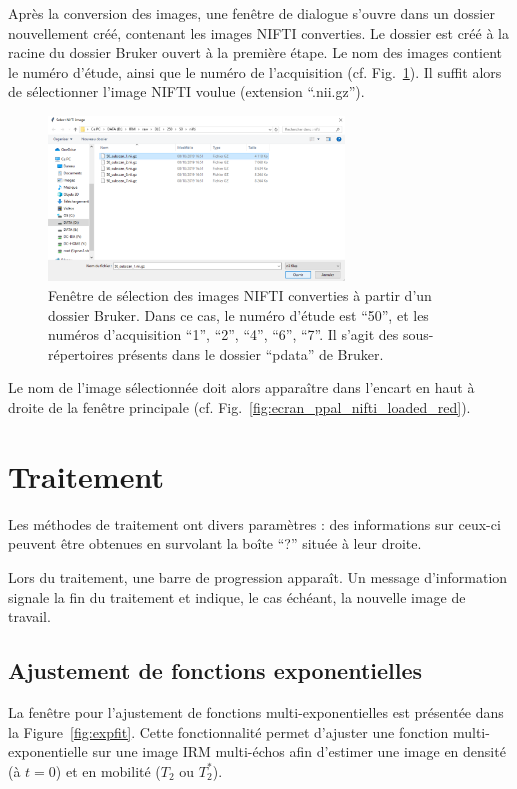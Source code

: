 \documentclass[french]{article}
\begin{document}
Après la conversion des images, une fenêtre de dialogue s'ouvre dans
un dossier nouvellement créé, contenant les images NIFTI converties.
Le dossier est créé à la racine du dossier Bruker ouvert à la première
étape. Le nom des images contient le numéro d'étude, ainsi que le
numéro de l'acquisition (cf. Fig.~\ref{fig:open_bruker_nii}). Il
suffit alors de sélectionner l'image NIFTI voulue (extension
``.nii.gz'').

\begin{figure}[ht]
  \centering
  \includegraphics[width=0.7\textwidth]{fig/open_bruker_nii}
  \caption{Fenêtre de sélection des images NIFTI converties à partir
    d'un dossier Bruker. Dans ce cas, le numéro d'étude est ``50'', et
    les numéros d'acquisition ``1'', ``2'', ``4'', ``6'', ``7''. Il
    s'agit des sous-répertoires présents dans le dossier ``pdata'' de
    Bruker.}
  \label{fig:open_bruker_nii}
\end{figure}

Le nom de l'image sélectionnée doit alors apparaître dans l'encart en
haut à droite de la fenêtre principale (cf. Fig.~\ref{fig:ecran_ppal_nifti_loaded_red}).

\section{Traitement}
Les méthodes de traitement ont divers paramètres : des informations
sur ceux-ci peuvent être obtenues en survolant la boîte ``?'' située à
leur droite.

Lors du traitement, une barre de progression apparaît. Un message
d'information signale la fin du traitement et indique, le cas échéant,
la nouvelle image de travail.

\subsection{Ajustement de fonctions exponentielles}

La fenêtre pour l'ajustement de fonctions multi-exponentielles est
présentée dans la Figure~\ref{fig:expfit}. Cette fonctionnalité permet
d'ajuster une fonction multi-exponentielle sur une image IRM
multi-échos afin d'estimer une image en densité (à $t = 0$) et en
mobilité ($T_2$ ou $T_2^*$).
\end{document}
